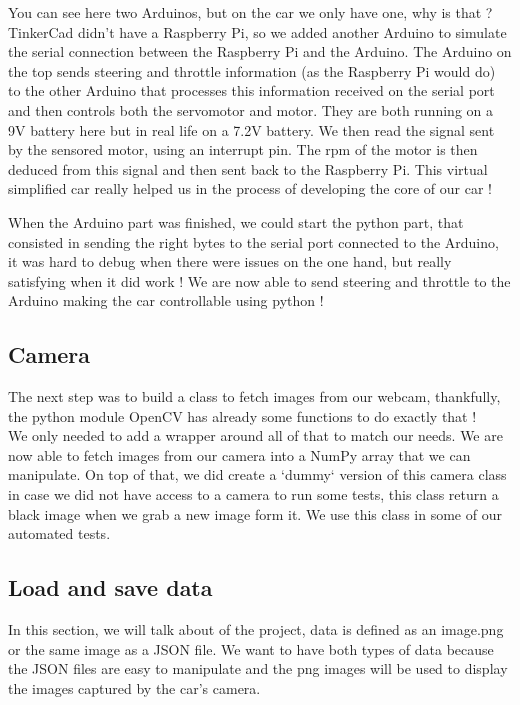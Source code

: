 \documentclass[12pt]{article}
\begin{document}
You can see here two Arduinos, but on the car we only have one, why is that ? TinkerCad didn't have a Raspberry Pi, so we added another Arduino to simulate the serial connection between the Raspberry Pi and the Arduino. The Arduino on the top sends steering and throttle information (as the Raspberry Pi would do) to the other Arduino that processes this information received on the serial port and then controls both the servomotor and motor. They are both running on a 9V battery here but in real life on a 7.2V battery. We then read the signal sent by the sensored motor, using an interrupt pin. The rpm of the motor is then deduced from this signal and then sent back to the Raspberry Pi.
This virtual simplified car really helped us in the process of developing the core of our car !

When the Arduino part was finished, we could start the python part, that consisted in sending the right bytes to the serial port connected to the Arduino, it was hard to debug when there were issues on the one hand, but really satisfying when it did work ! We are now able to send steering and throttle to the Arduino making the car controllable using python !

\subsection{Camera}
The next step was to build a class to fetch images from our webcam, thankfully, the python module OpenCV has already some functions to do exactly that ! \\
We only needed to add a wrapper around all of that to match our needs. We are now able to fetch images from our camera into a NumPy array that we can manipulate. On top of that, we did create a `dummy` version of this camera class in case we did not have access to a camera to run some tests, this class return a black image when we grab a new image form it. We use this class in some of our automated tests.

\subsection{Load and save data}
In this section, we will talk about of the project, data is defined as an image.png or the same image as a JSON file. We want to have both types of data because the JSON files are easy to manipulate and the png images will be used to display the images captured by the car's camera.\\
\end{document}

